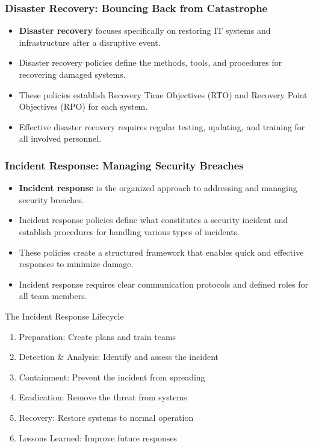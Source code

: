 \documentclass{beamer}
\begin{document}
\begin{frame}
\frametitle{Disaster Recovery: Bouncing Back from Catastrophe}
\small
\begin{itemize}
\item \textbf{Disaster recovery} focuses specifically on restoring IT systems and infrastructure after a disruptive event.
\item Disaster recovery policies define the methods, tools, and procedures for recovering damaged systems.
\item These policies establish Recovery Time Objectives (RTO) and Recovery Point Objectives (RPO) for each system.
\item Effective disaster recovery requires regular testing, updating, and training for all involved personnel.
\end{itemize}

\end{frame}


\begin{frame}
\frametitle{Incident Response: Managing Security Breaches}
\begin{itemize}
\item \textbf{Incident response} is the organized approach to addressing and managing security breaches.
\item Incident response policies define what constitutes a security incident and establish procedures for handling various types of incidents.
\item These policies create a structured framework that enables quick and effective responses to minimize damage.
\item Incident response requires clear communication protocols and defined roles for all team members.
\end{itemize}

\begin{block}{The Incident Response Lifecycle}
\scriptsize
\begin{enumerate}
\item Preparation: Create plans and train teams
\item Detection \& Analysis: Identify and assess the incident
\item Containment: Prevent the incident from spreading
\item Eradication: Remove the threat from systems
\item Recovery: Restore systems to normal operation
\item Lessons Learned: Improve future responses
\end{enumerate}
\end{block}
\end{frame}
\end{document}
